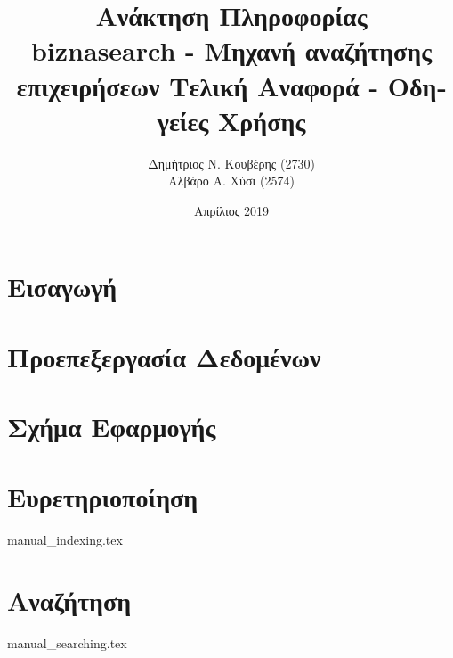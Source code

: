 \documentclass[10pt,a4paper]{article}
\title{%
  \huge \textgreek{Ανάκτηση Πληροφορίας} \\
\large biznasearch - \textgreek{Μηχανή αναζήτησης επιχειρήσεων}}
\author{
    \textgreek{Δημήτριος Ν. Κουβέρης} (2730) \\
    \textgreek{Αλβάρο Α. Χύσι} (2574)
}
\date{\textgreek{Απρίλιος} 2019}
\begin{document}

    \title{
    \huge \textgreek {Τελική Αναφορά - Οδηγείες Χρήσης}}

    \maketitle
    \newpage
    \renewcommand{\contentsname}{\textgreek{Περιεχόμενα}}
    \tableofcontents


    \newpage
    \section{\textgreek{Εισαγωγή}}
    

    \section{\textgreek{Προεπεξεργασία Δεδομένων}}
    

    \section{\textgreek{Σχήμα Εφαρμογής}}
    

    \section{\textgreek{Ευρετηριοποίηση}}
     {manual_indexing.tex}

    \section{\textgreek{Αναζήτηση}}
     {manual_searching.tex}
\end{document}

